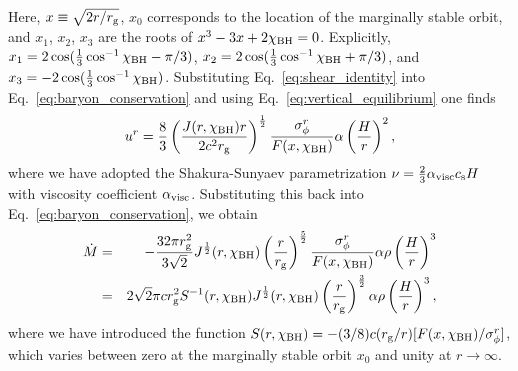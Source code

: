 Here, $x\equiv \sqrt{2r/r_{\rm g}}$, $x_0$ corresponds to the location of the marginally stable orbit, and $x_1$, $x_2$, $x_3$ are the roots of $x^3-3x+2\chi_{\rm BH}=0$. Explicitly, $x_1=2\cos(\frac{1}{3}\cos^{-1}\chi_{\rm BH}-\pi/3)$, $x_2=2\cos(\frac{1}{3}\cos^{-1}\chi_{\rm BH}+\pi/3)$, and $x_3=-2\cos(\frac{1}{3}\cos^{-1}\chi_{\rm BH})$.
Substituting Eq.~\eqref{eq:shear_identity} into Eq.~\eqref{eq:baryon_conservation} and using Eq.~\eqref{eq:vertical_equilibrium} one finds
\begin{equation}
	u^r = \frac{8}{3} \left(\frac{J(r,\chi_{\rm BH}) r}{2c^2 r_{\rm g}}\right)^{\frac{1}{2}} \frac{\sigma^r_\phi}{F(x,\chi_{\rm BH})}\alpha \left(\frac{H}{r}\right)^2, 
\end{equation}
where we have adopted the Shakura-Sunyaev parametrization $\nu = \frac{2}{3}\alpha_{\rm visc} c_{\rm s} H$ with viscosity coefficient $\alpha_{\rm visc}$. Substituting this back into Eq.~\eqref{eq:baryon_conservation}, we obtain
\begin{eqnarray}
	\dot{M} &=& - \frac{32\pi r_{\rm g}^2}{3\sqrt{2}} J^{\frac{1}{2}}(r,\chi_{\rm BH}) \left(\frac{r}{r_{\rm g}}\right)^{\frac{5}{2}} \frac{\sigma^r_\phi}{F(x,\chi_{\rm BH})}\alpha \rho \left(\frac{H}{r}\right)^3  \label{eq:Mdot_1D_1} \\
		&=& 2\sqrt{2}\pi c r_{\rm g}^2 S^{-1}(r,\chi_{\rm BH}) J^{\frac{1}{2}}(r,\chi_{\rm BH})  \left(\frac{r}{r_{\rm g}}\right)^{\frac{3}{2}} \alpha \rho \left(\frac{H}{r}\right)^3,  \label{eq:Mdot_1D_2}
\end{eqnarray}
where we have introduced the function $S(r,\chi_{\rm BH})=-(3/8)c(r_{\rm g}/r) [F(x,
\chi_{\rm BH})/\sigma^r_\phi]$, which varies between zero at the marginally stable orbit $x_0$ and unity at $r\rightarrow\infty$.

